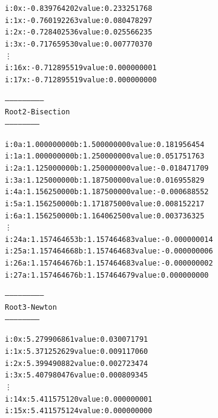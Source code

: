 \documentclass[11pt]{article} %
\begin{document}
\begin{enumerate}[i.)]
\begin{alltt}
i: 0	x: -0.839764202	value: 0.233251768
i: 1	x: -0.760192263	value: 0.080478297
i: 2	x: -0.728402536	value: 0.025566235
i: 3	x: -0.717659530	value: 0.007770370
  \vdots
i: 16	x: -0.712895519	value: 0.000000001
i: 17	x: -0.712895519	value: 0.000000000


--------------------------
 Root 2 - Bisection
 -----------------------


i: 0	a: 1.000000000	b: 1.500000000	value: 0.181956454 
i: 1	a: 1.000000000	b: 1.250000000	value: 0.051751763 
i: 2	a: 1.125000000	b: 1.250000000	value: -0.018471709 
i: 3	a: 1.125000000	b: 1.187500000	value: 0.016955829 
i: 4	a: 1.156250000	b: 1.187500000	value: -0.000688552 
i: 5	a: 1.156250000	b: 1.171875000	value: 0.008152217 
i: 6	a: 1.156250000	b: 1.164062500	value: 0.003736325 
  \vdots
i: 24	a: 1.157464653	b: 1.157464683	value: -0.000000014 
i: 25	a: 1.157464668	b: 1.157464683	value: -0.000000006 
i: 26	a: 1.157464676	b: 1.157464683	value: -0.000000002 
i: 27	a: 1.157464676	b: 1.157464679	value: 0.000000000 


--------------------------
 Root 3 - Newton
 -----------------------


i: 0	x: 5.279906861	value: 0.030071791
i: 1	x: 5.371252629	value: 0.009117060
i: 2	x: 5.399490882	value: 0.002723474
i: 3	x: 5.407980476	value: 0.000809345
  \vdots
i: 14	x: 5.411575120	value: 0.000000001
i: 15	x: 5.411575124	value: 0.000000000
\end{alltt}
\end{enumerate}
\end{document}
